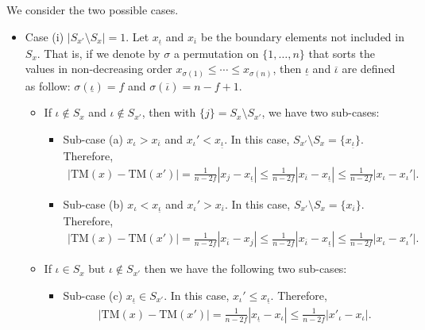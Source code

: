 \documentclass[twoside,11pt]{article}
\begin{document}
We consider the two possible cases.
\begin{itemize}
    \item Case (i) $| S_{x'} \setminus S_{x} | = 1$. Let $x_{\underline{\iota}}$ and $x_{\overline{\iota}}$ be the boundary elements not included in $S_x$.
    That is, if we denote by $\sigma$ a permutation on $\{1, \ldots, n\}$ that sorts the values in non-decreasing order $x_{\sigma(1)} \leq \cdots \leq x_{\sigma(n)}$, then $\underline{\iota}$ and $\overline{\iota}$ are defined as follow: $\sigma(\underline{\iota}) = f$ and $\sigma(\overline{\iota})= n - f + 1$.
    \begin{itemize}
        \item[$\circ$] If $\iota \notin S_x$ and $\iota \notin S_{x'}$, then with $\{j\} = S_{x} \setminus S_{x'}$, we have two sub-cases:
        \begin{itemize}
            \item[] Sub-case (a) $x_\iota > x_{\overline{\iota}}$ and $x_\iota' < x_{\underline{\iota}}$. In this case, $S_{x'} \setminus S_{x} = \{ x_{\underline{\iota}} \}$. Therefore, 
            \begin{align*}
                \textstyle |\mathrm{TM}(x) - \mathrm{TM}(x')| = \frac{1}{n-2f} | x_j-x_{\underline{\iota}} | \leq \frac{1}{n-2f} | x_{\overline{\iota}}-x_{\underline{\iota}} | \leq \frac{1}{n-2f} | x_\iota - x_\iota' |.
            \end{align*} 
            \item[] Sub-case (b) $x_\iota < x_{\underline{\iota}}$ and $x_\iota' > x_{\overline{\iota}}$. In this case, $S_{x'} \setminus S_{x} = \{ x_{\overline{\iota}} \}$. Therefore,
            \begin{align*}
                \textstyle |\mathrm{TM}(x) - \mathrm{TM}(x')| = \frac{1}{n-2f} | x_{\overline{\iota}} - x_j | \leq \frac{1}{n-2f} | x_{\overline{\iota}} - x_{\underline{\iota}} | \leq \frac{1}{n-2f} | x_\iota - x_\iota' |.
            \end{align*}
        \end{itemize}
        \item[$\circ$] If $\iota \in S_x$ but $\iota \notin S_{x'}$ then we have the following two sub-cases:
        \begin{itemize}
            \item[] Sub-case (c) $x_{\underline{\iota}} \in S_{x'}$. In this case, $x_\iota' \leq x_{\underline{\iota}}$. Therefore,
            \begin{align*}
                \textstyle |\mathrm{TM}(x) - \mathrm{TM}(x')| = \frac{1}{n-2f}|x_{\underline{\iota}}-x_\iota| \leq \frac{1}{n-2f}|x'_\iota-x_\iota| .

\end{align*}
\end{itemize}
\end{itemize}
\end{itemize}
\end{document}
